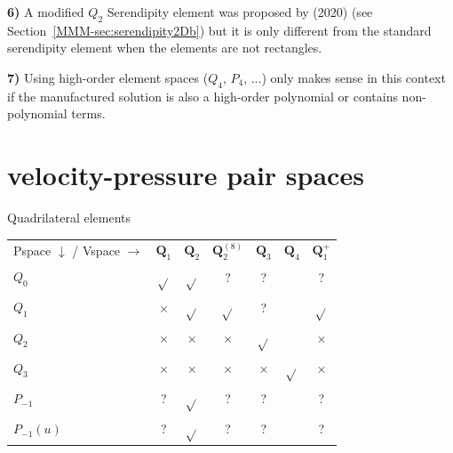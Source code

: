 \begin{remark}
{\bf 6)} A modified $Q_2$ Serendipity element was proposed by \textcite{zhxi20} (2020) 
(see Section~\ref{MMM-sec:serendipity2Db}) but it is only different from the standard serendipity 
element when the elements are not rectangles. 
\end{remark}

\begin{remark}
{\bf 7)} Using high-order element spaces ($Q_4$, $P_4$, ...) only makes 
sense in this context if the manufactured solution is also a high-order polynomial 
or contains non-polynomial terms.
\end{remark}


\newpage
\section*{velocity-pressure pair spaces}

\begin{center}
Quadrilateral elements\\
\begin{tabular}{lcccccc}
\hline
Pspace $\downarrow$ / Vspace $\rightarrow$   
  & ${\bm Q}_1$  & ${\bm Q}_2$     & ${\bm Q}_2^{(8)}$ & ${\bm Q}_3$  & ${\bm Q}_4$ & ${\bm Q}_1^+$       \\ 
$Q_0$       & $\sqrt{}$ & $\sqrt{}$ & ?           & ?         &   & ?          \\
$Q_1$       & $\times$  & $\sqrt{}$ & $\sqrt{}$   & ?         &   & $\sqrt{}$  \\
$Q_2$       & $\times$  & $\times$  & $\times$    & $\sqrt{}$ &   & $\times$   \\
$Q_3$       & $\times$  & $\times$  & $\times$    & $\times$  & $\sqrt{}$ & $\times$ \\
$P_{-1}$    & ?         & $\sqrt{}$ & ?           & ?         &   & ?          \\
$P_{-1}(u)$ & ?         & $\sqrt{}$ & ?           & ?         &   & ?          \\
\hline
\end{tabular}
\end{center}

